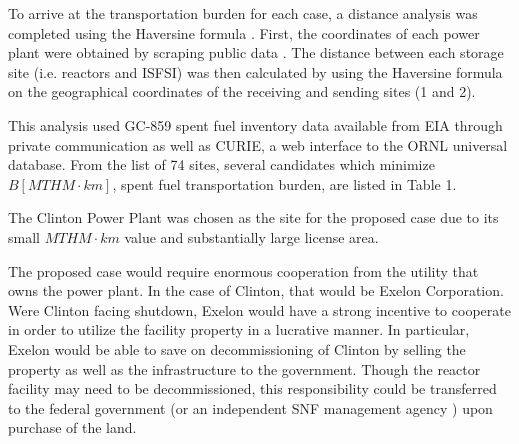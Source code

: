  To arrive at the transportation burden for each case, a distance analysis was 
 completed using the Haversine formula \cite{shumaker_astronomical_1984}. 
 First, the coordinates of each power plant were obtained by scraping public 
 data \cite{nuclear_regulatory_commission_nrc:_2016}.  The distance between each storage site (i.e. reactors 
 and \gls{ISFSI}) was then calculated by using the Haversine formula on the 
 geographical coordinates of the receiving and sending sites (1 and 2). 

This analysis used GC-859 spent fuel inventory data available from \gls{EIA} 
through private communication \cite{domenico_GC-859_2016} as well as \gls{CURIE}, a web interface to 
the \gls{ORNL} universal database\cite{ornl_centralized_2016}.
From the list of 74 sites, several candidates which minimize $B [MTHM\cdot 
km]$, spent fuel transportation burden, are listed in Table 1.
    
    \begin{table}[h]
    	\centering
    	
    	\caption {Reactors with relatively small spent fuel transportation burden $ [MTHM\cdot km]$.}
    		\end {table}

The Clinton Power Plant was chosen as the site for the proposed case due to its
small $MTHM\cdot km$ value and substantially large license 
area\cite{nrc_chapter_2007}.

The proposed case would require enormous cooperation from the utility that owns
the power plant. In the case of Clinton, that would be Exelon Corporation. 
Were Clinton facing shutdown, Exelon would have a strong incentive to 
cooperate in order to utilize the facility property
in a lucrative manner. In particular, Exelon would be able to save on decommissioning of
Clinton by selling the property as well as the infrastructure to the 
government. Though the reactor facility may need to be decommissioned, 
this responsibility could be transferred to the federal government (or 
an independent \gls{SNF} management agency \cite{ayers_blue_2012}) upon 
purchase of the land.


